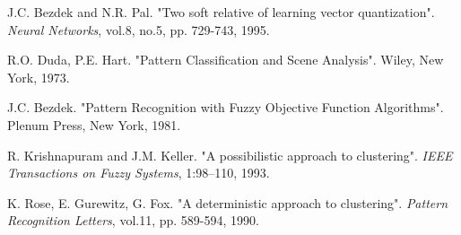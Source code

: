 \documentclass[12pt,a4paper]{cibb}
\begin{document}

{\fontsize{10}{10}\selectfont
\begin{thebibliography}{99}
\setlength{\parskip}{0pt}
J.C. Bezdek and N.R. Pal. "Two soft relative of learning
vector quantization".  {\em Neural Networks}, vol.8, no.5, pp. 729-743, 1995.

R.O. Duda, P.E. Hart.
"Pattern Classification and Scene Analysis".
Wiley, New York, 1973.

J.C. Bezdek.
"Pattern Recognition with Fuzzy Objective Function Algorithms".
Plenum Press, New York, 1981.

R. Krishnapuram and J.M. Keller.
"A possibilistic approach to clustering".
{\em IEEE Transactions on Fuzzy Systems}, 1:98--110, 1993.

K. Rose, E. Gurewitz, G. Fox.
"A deterministic approach to clustering".
{\em Pattern Recognition Letters}, vol.11, pp. 589-594, 1990.

\end{thebibliography}
}
\end{document}
